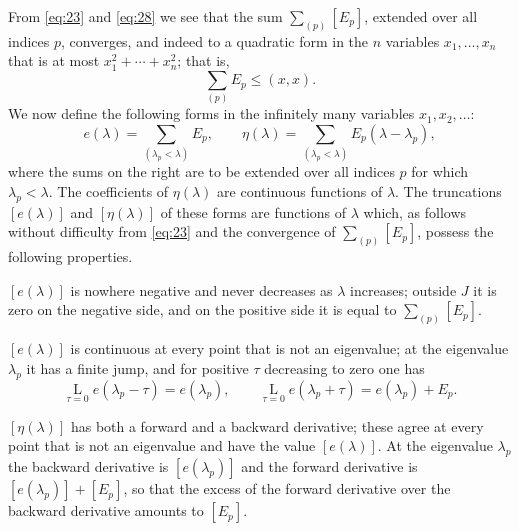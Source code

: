 \documentclass[b5paper,twoside]{article}
\newcommand{\originalpage}[1]{\phantomsection\label{origpage:#1}}
\begin{document}
From \eqref{eq:23} and \eqref{eq:28} we see that the sum
$\sum_{(p)}[E_p]$, extended over all indices $p$, converges, and indeed to a
quadratic form in the $n$ variables $x_1,\ldots,x_n$ that is at most
$x_1^2+\cdots+x_n^2$; that is,
\[
  \sum_{(p)}E_p\le(x,x).
\]
We now define the following forms in the infinitely many variables
$x_1,x_2,\ldots$:
\[
  e(\lambda)=\sum_{(\lambda_p<\lambda)}E_p,
  \qquad
  \eta(\lambda)=\sum_{(\lambda_p<\lambda)}E_p(\lambda-\lambda_p),
\]
where the sums on the right are to be extended over all indices $p$ for which
$\lambda_p<\lambda$.  The coefficients of
\originalpage{171}$\eta(\lambda)$ are continuous functions of $\lambda$.
The truncations $[e(\lambda)]$ and $[\eta(\lambda)]$ of these forms are
functions of $\lambda$ which, as follows without difficulty from
\eqref{eq:23} and the convergence of $\sum_{(p)}[E_p]$, possess the following
properties.

$[e(\lambda)]$ is nowhere negative and never decreases as $\lambda$
increases; outside $J$ it is zero on the negative side, and on the positive
side it is equal to $\sum_{(p)}[E_p]$.

$[e(\lambda)]$ is continuous at every point that is not an eigenvalue; at the
eigenvalue $\lambda_p$ it has a finite jump, and for positive $\tau$
decreasing to zero one has
\[
  \mathop{\mathrm{L}}\limits_{\tau=0}e(\lambda_p-\tau)=e(\lambda_p),
  \qquad
  \mathop{\mathrm{L}}\limits_{\tau=0}e(\lambda_p+\tau)
  =e(\lambda_p)+E_p.
\]

$[\eta(\lambda)]$ has both a forward and a backward derivative; these agree
at every point that is not an eigenvalue and have the value $[e(\lambda)]$.
At the eigenvalue $\lambda_p$ the backward derivative is $[e(\lambda_p)]$ and
the forward derivative is $[e(\lambda_p)]+[E_p]$, so that the excess of the
forward derivative over the backward derivative amounts to $[E_p]$.
\end{document}
